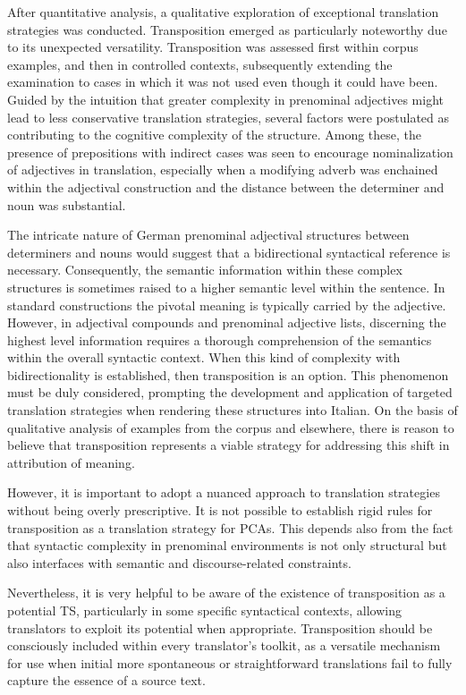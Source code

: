\documentclass[output=paper,colorlinks,citecolor=brown]{langscibook}
\begin{document}
After quantitative analysis, a qualitative exploration of exceptional translation strategies was conducted. Transposition emerged as particularly noteworthy due to its unexpected versatility. Transposition was assessed first within corpus examples, and then in controlled contexts, subsequently extending the examination to cases in which it was not used even though it could have been. Guided by the intuition that greater complexity in prenominal adjectives might lead to less conservative translation strategies, several factors were postulated as contributing to the cognitive complexity of the structure. Among these, the presence of prepositions with indirect cases was seen to encourage nominalization of adjectives in translation, especially when a modifying adverb was enchained within the adjectival construction and the distance between the determiner and noun was substantial.

The intricate nature of German prenominal adjectival structures between determiners and nouns would suggest that a bidirectional syntactical reference is necessary. Consequently, the semantic information within these complex structures is sometimes raised to a higher semantic level within the sentence. In standard constructions the pivotal meaning is typically carried by the adjective. However, in adjectival compounds and prenominal adjective lists, discerning the highest level information requires a thorough comprehension of the semantics within the overall syntactic context. When this kind of complexity with bidirectionality is established, then transposition is an option. This phenomenon must be duly considered, prompting the development and application of targeted translation strategies when rendering these structures into Italian. On the basis of qualitative analysis of examples from the corpus and elsewhere, there is reason to believe that transposition represents a viable strategy for addressing this shift in attribution of meaning.

However, it is important to adopt a nuanced approach to translation strategies without being overly prescriptive. It is not possible to establish rigid rules for transposition as a translation strategy for PCAs. This depends also from the fact that syntactic complexity in prenominal environments is not only structural but also interfaces with semantic and discourse-related constraints.

Nevertheless, it is very helpful to be aware of the existence of transposition as a potential TS, particularly in some specific syntactical contexts, allowing translators to exploit its potential when appropriate. Transposition should be consciously included within every translator’s toolkit, as a versatile mechanism for use when initial more spontaneous or straightforward translations fail to fully capture the essence of a source text.
\sloppy\printbibliography[heading=subbibliography,notkeyword=this]
\end{document}
